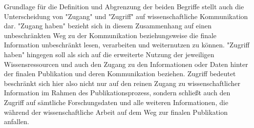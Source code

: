 Grundlage für die Definition und Abgrenzung der beiden Begriffe stellt auch die Unterscheidung von "Zugang" und "Zugriff" auf wissenschaftliche Kommunikation dar. "Zugang haben" bezieht sich in diesem Zusammenhang auf einen unbeschränkten Weg zu der Kommunikation beziehungsweise die finale Information unbeschränkt lesen\cite{cite:9a}, verarbeiten und weiternutzen zu können. "Zugriff haben" hingegen soll als sich auf die erweiterte Nutzung der jeweiligen Wissensressourcen und auch den Zugang zu den Informationen oder Daten hinter der finalen Publikation und deren Kommunikation beziehen\cite{cite:9b}. Zugriff bedeutet beschränkt sich hier also nicht nur auf den reinen Zugang zu wissenschaftlicher Information im Rahmen des Publikationsprozess, sondern schließt auch den Zugriff auf sämtliche Forschungsdaten und alle weiteren Informationen, die während der wissenschaftliche Arbeit auf dem Weg zur finalen Publikation anfallen\cite{cite:9c}.